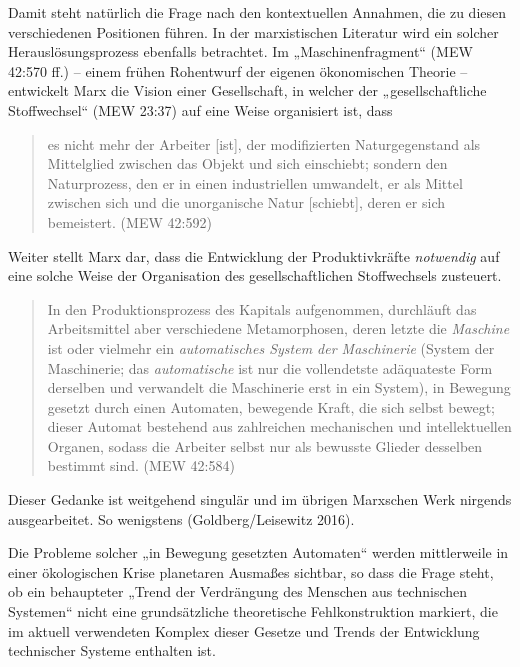 \documentclass[11pt,a4paper]{article}
\begin{document}
Damit steht natürlich die Frage nach den kontextuellen Annahmen, die zu diesen
verschiedenen Positionen führen. In der marxistischen Literatur wird ein
solcher Herauslösungsprozess ebenfalls betrachtet.  Im „Maschinenfragment“
(MEW 42:570 ff.) -- einem frühen Rohentwurf der eigenen ökonomischen Theorie
-- entwickelt Marx die Vision einer Gesellschaft, in welcher der
„gesellschaftliche Stoffwechsel“ (MEW 23:37) auf eine Weise organisiert ist,
dass
\begin{quote}
  es nicht mehr der Arbeiter [ist], der modifizierten Naturgegenstand als
  Mittelglied zwischen das Objekt und sich einschiebt; sondern den
  Naturprozess, den er in einen industriellen umwandelt, er als Mittel
  zwischen sich und die unorganische Natur [schiebt], deren er sich
  bemeistert.  (MEW 42:592)
\end{quote}
Weiter stellt Marx dar, dass die Entwicklung der Produktivkräfte
\emph{notwendig} auf eine solche Weise der Organisation des gesellschaftlichen
Stoffwechsels zusteuert.
\begin{quote}
  In den Produktionsprozess des Kapitals aufgenommen, durchläuft das
  Arbeitsmittel aber verschiedene Metamorphosen, deren letzte die
  \emph{Maschine} ist oder vielmehr ein \emph{automatisches System der
    Maschinerie} (System der Maschinerie; das \emph{automatische} ist nur die
  vollendetste adäquateste Form derselben und verwandelt die Maschinerie erst
  in ein System), in Bewegung gesetzt durch einen Automaten, bewegende Kraft,
  die sich selbst bewegt; dieser Automat bestehend aus zahlreichen mechanischen
  und intellektuellen Organen, sodass die Arbeiter selbst nur als bewusste
  Glieder desselben bestimmt sind. (MEW 42:584)
\end{quote}
Dieser Gedanke ist weitgehend singulär und im übrigen Marxschen Werk nirgends
ausgearbeitet. So wenigstens (Goldberg/Leisewitz 2016).

Die Probleme solcher „in Bewegung gesetzten Automaten“ werden mittlerweile in
einer ökolo\-gischen Krise planetaren Ausmaßes sichtbar, so dass die Frage
steht, ob ein behaupteter „Trend der Verdrängung des Menschen aus technischen
Systemen“ nicht eine grundsätzliche theoretische Fehlkonstruktion markiert,
die im aktuell verwendeten Komplex dieser Gesetze und Trends der Entwicklung
technischer Systeme enthalten ist. 
\end{document}
